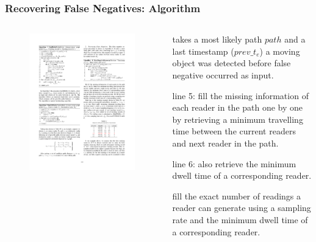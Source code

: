 \begin{frame}
\frametitle{Recovering False Negatives: Algorithm}

\begin{columns}

  \begin{figure}[tb]
    \includegraphics[width=\columnwidth]{figures/3-3/3-3-10.pdf}
  \end{figure}

  \begin{sitemize}
    \item takes a most likely path $path$ and a last timestamp ($prev\_t_e$) a moving object was detected before false negative occurred as input.
    \item line 5: fill the missing information of each reader in the path one by one by retrieving a minimum travelling time between the current readers and next reader in the path.
    \item line 6: also retrieve the minimum dwell time of a corresponding reader.
    \item fill the exact number of readings a reader can generate using a sampling rate and the minimum dwell time of a corresponding reader.
  \end{sitemize}

\end{columns}

\end{frame}

